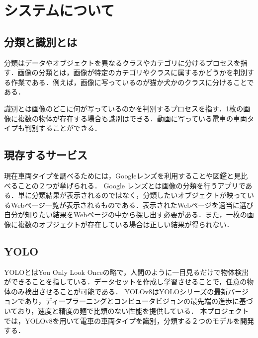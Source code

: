 

\chapter{システムについて}\label{system}
\section{分類と識別とは}
分類はデータやオブジェクトを異なるクラスやカテゴリに分けるプロセスを指す．画像の分類とは，画像が特定のカテゴリやクラスに属するかどうかを判別する作業である．例えば，画像に写っているのが猫か犬かのクラスに分けることである．

識別とは画像のどこに何が写っているのかを判別するプロセスを指す．1枚の画像に複数の物体が存在する場合も識別はできる．動画に写っている電車の車両タイプも判別することができる．



\section{現存するサービス}
現在車両タイプを調べるためには，Googleレンズを利用することや図鑑と見比べることの２つが挙げられる．
Google レンズとは画像の分類を行うアプリである．単に分類結果が表示されるのではなく，分類したいオブジェクトが映っているWebページ一覧が表示されるものである．表示されたWebページを適当に選び自分が知りたい結果をWebページの中から探し出す必要がある．また，一枚の画像に複数のオブジェクトが存在している場合は正しい結果が得られない．


\section{YOLO}
YOLOとはYou Only Look Onceの略で，人間のように一目見るだけで物体検出ができることを指している\cite{YOLO}．データセットを作成し学習させることで，任意の物体のみ検出させることが可能である．
YOLOv8はYOLOシリーズの最新バージョンであり，ディープラーニングとコンピュータビジョンの最先端の進歩に基づいており，速度と精度の麺で比類のない性能を提供している．
本プロジェクトでは，YOLOv8を用いて電車の車両タイプを識別，分類する２つのモデルを開発する．

